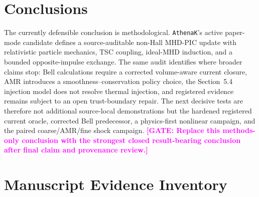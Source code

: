 \documentclass[twocolumn]{aastex701}
\newcommand{\athenak}{\texttt{AthenaK}\xspace}
\newcommand{\GATE}[1]{\textcolor{magenta}{\textbf{[GATE: #1]}}}
\begin{document}
\section{Conclusions}
\label{sec:conclusions}

The currently defensible conclusion is methodological. \athenak's active
paper-mode candidate defines a source-auditable non-Hall MHD-PIC update with
relativistic particle mechanics, TSC coupling, ideal-MHD induction, and a
bounded opposite-impulse exchange. The same audit identifies where broader
claims stop: Bell calculations require a corrected volume-aware current
closure, AMR introduces a smoothness--conservation policy choice, the
Section~5.4 injection model does not resolve thermal injection, and registered
evidence remains subject to an open trust-boundary repair. The next decisive
tests are therefore not additional source-local demonstrations but the
hardened registered current oracle, corrected Bell predecessor, a physics-first
nonlinear campaign, and the paired coarse/AMR/fine shock campaign.
\GATE{Replace this methods-only conclusion with the strongest closed
result-bearing conclusion after final claim and provenance review.}

\appendix

\section{Manuscript Evidence Inventory}
\label{app:evidence-inventory}
\end{document}
